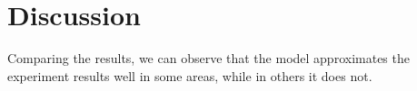\documentclass[10pt,letterpaper]{article}
\begin{document}
\section{Discussion}
Comparing the results, we can observe that the model approximates the experiment results well in some areas, while in others it does not.



\setlength{\bibleftmargin}{.125in}
\setlength{\bibindent}{-\bibleftmargin}

\end{document}
